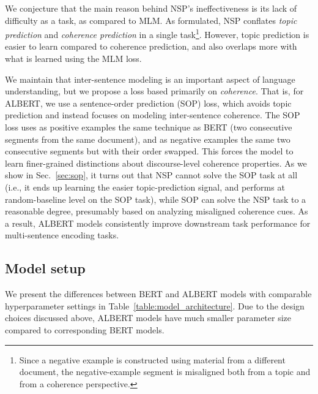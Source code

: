 We conjecture that the main reason behind NSP's ineffectiveness is its lack of difficulty as a task, as compared to MLM.
As formulated, NSP conflates {\em topic prediction} and {\em coherence prediction} in a single task\footnote{Since a negative example is constructed using material from a different document, the negative-example segment is misaligned both from a topic and from a coherence perspective.}.
However, topic prediction is easier to learn compared to coherence prediction, and also overlaps more with what is learned using the MLM loss.

We maintain that inter-sentence modeling is an important aspect of language understanding, but we propose a loss based primarily on {\em coherence}. 
That is, for ALBERT, we use a sentence-order prediction (SOP) loss, which avoids topic prediction and instead focuses on modeling inter-sentence coherence.
The SOP loss uses as positive examples the same technique as BERT (two consecutive segments from the same document), and as negative examples the same two consecutive segments but with their order swapped.
This forces the model to learn finer-grained distinctions about discourse-level coherence properties.
As we show in Sec.~\ref{sec:sop}, it turns out that NSP cannot solve the SOP task at all (i.e., it ends up learning the easier topic-prediction signal, and performs at random-baseline level on the SOP task), while SOP can solve the NSP task to a reasonable degree, presumably based on analyzing misaligned coherence cues. 
As a result, ALBERT models consistently improve downstream task performance for multi-sentence encoding tasks.

\subsection{Model setup}
We present the differences between BERT and ALBERT models with comparable hyperparameter settings in Table~\ref{table:model_architecture}.
Due to the design choices discussed above, ALBERT models have much smaller parameter size compared to corresponding BERT models.


